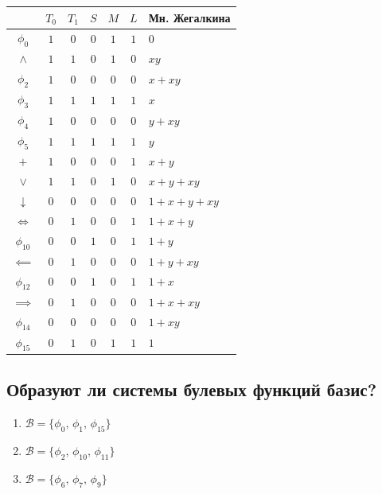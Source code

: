 \documentclass[12pt,a4paper]{article}
\theoremstyle{plain}
\theoremstyle{definition}
\theoremstyle{remark}
\numberwithin{equation}{section}
\begin{document}
\noindent\begin{tabularx}{\linewidth}{|c|c|c|c|c|c|X|}
  \hline
               & $T_0$ & $T_1$ & $S$ & $M$ & $L$ & Мн. Жегалкина \\
  \hline
  $\phi_0$     &  $1$  &  $0$  & $0$ & $1$ & $1$ & $0$ \\
  $\land$      &  $1$  &  $1$  & $0$ & $1$ & $0$ & $xy$ \\
  $\phi_2$     &  $1$  &  $0$  & $0$ & $0$ & $0$ & $x + xy$ \\
  $\phi_3$     &  $1$  &  $1$  & $1$ & $1$ & $1$ & $x$ \\
  $\phi_4$     &  $1$  &  $0$  & $0$ & $0$ & $0$ & $y + xy$ \\
  $\phi_5$     &  $1$  &  $1$  & $1$ & $1$ & $1$ & $y$ \\
  $+$          &  $1$  &  $0$  & $0$ & $0$ & $1$ & $x + y$ \\
  $\lor$       &  $1$  &  $1$  & $0$ & $1$ & $0$ & $x + y + xy$ \\
  $\downarrow$ &  $0$  &  $0$  & $0$ & $0$ & $0$ & $1 + x + y + xy$ \\
  $\iff$       &  $0$  &  $1$  & $0$ & $0$ & $1$ & $1 + x + y$ \\
  $\phi_{10}$  &  $0$  &  $0$  & $1$ & $0$ & $1$ & $1 + y$ \\
  $\impliedby$ &  $0$  &  $1$  & $0$ & $0$ & $0$ & $1 + y + xy$ \\
  $\phi_{12}$  &  $0$  &  $0$  & $1$ & $0$ & $1$ & $1 + x$ \\
  $\implies$   &  $0$  &  $1$  & $0$ & $0$ & $0$ & $1 + x + xy$ \\
  $\phi_{14}$  &  $0$  &  $0$  & $0$ & $0$ & $0$ & $1 + xy$ \\
  $\phi_{15}$  &  $0$  &  $1$  & $0$ & $1$ & $1$ & $1$ \\
  \hline
\end{tabularx}

\subsection{Образуют ли системы булевых функций базис?}
\begin{enumerate}
  \renewcommand{\labelenumi}{\asbuk{enumi})}
  \item $\mathcal{B} = \{\phi_0,\,\phi_1,\,\phi_{15}\}$
  \item $\mathcal{B} = \{\phi_2,\,\phi_{10},\,\phi_{11}\}$
  \item $\mathcal{B} = \{\phi_6,\,\phi_7,\,\phi_{9}\}$
\end{enumerate}
\end{document}

